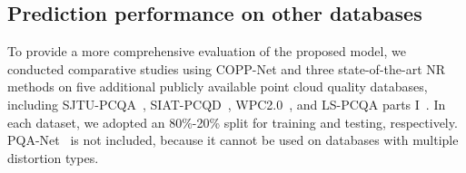 \documentclass[conference]{IEEEtran}
\begin{document}
\begin{table*}[t]       \begin{center}
\footnotesize
\caption{Experiments on other databases. We compared the COPP-Net with the best performing prior NR models. All models use their default configurations and they are trained from scratch.} \label{tab:Cross database}
\medskip
\end{center}
\end{table*}


\subsection{Prediction performance on other databases}
To provide a more comprehensive evaluation of the proposed model, we conducted comparative studies using COPP-Net and three state-of-the-art NR methods on five additional publicly available point cloud quality databases, including SJTU-PCQA~\cite{yang2020predicting}, SIAT-PCQD~\cite{wu2021subjective}, WPC2.0~\cite{liu2021reduced}, and LS-PCQA parts I~\cite{liu2022point}. In each dataset, we adopted an 80\%-20\% split for training and testing, respectively. PQA-Net~\cite{liu2021pqa} is not included, because it cannot be used on databases with multiple distortion types.
\end{document}

